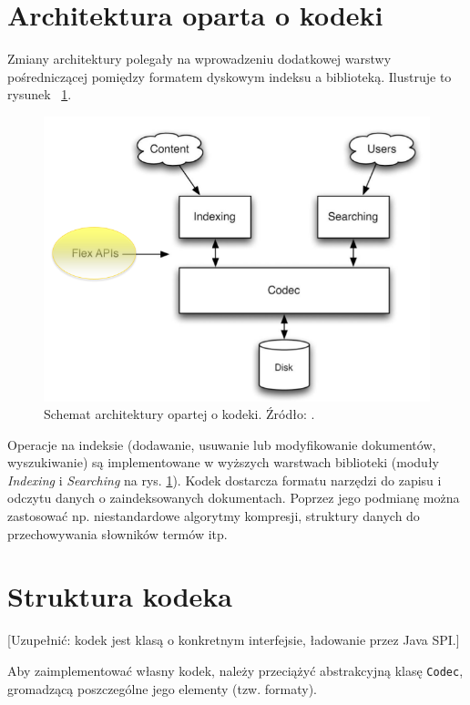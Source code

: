 \section{Architektura oparta o kodeki}

Zmiany architektury polegały na wprowadzeniu dodatkowej warstwy pośredniczącej pomiędzy formatem dyskowym indeksu a biblioteką. Ilustruje to rysunek ~\ref{fig:newarchitecture}.

\begin{figure}[here]
 \includegraphics[scale=0.5]{pictures/architecture.png}
 \caption{Schemat architektury opartej o kodeki. Źródło: \cite{flexindex}.\label{fig:newarchitecture}}
\end{figure}

Operacje na indeksie (dodawanie, usuwanie lub modyfikowanie dokumentów, wyszukiwanie) są implementowane w wyższych warstwach biblioteki (moduły \emph{Indexing} i \emph{Searching} na rys. \ref{fig:newarchitecture}). Kodek dostarcza formatu narzędzi do zapisu i odczytu danych o zaindeksowanych dokumentach. Poprzez jego podmianę można zastosować np. niestandardowe algorytmy kompresji, struktury danych do przechowywania słowników termów itp.

\section{Struktura kodeka}
\label{sec:codecStructure}

[Uzupełnić: kodek jest klasą o konkretnym interfejsie, ładowanie przez Java SPI.]

Aby zaimplementować własny kodek, należy przeciążyć abstrakcyjną klasę \texttt{Codec}, gromadzącą poszczególne jego elementy (tzw. formaty).

